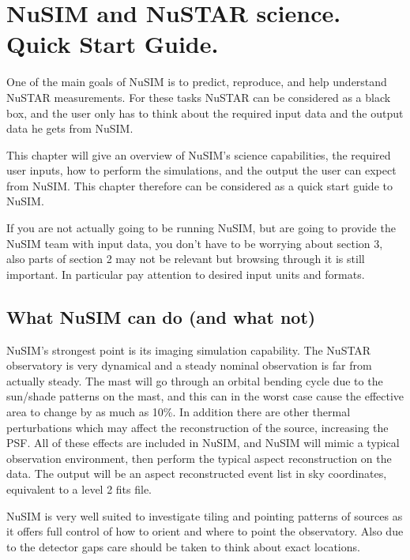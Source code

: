 %

\chapter{NuSIM and NuSTAR science. Quick Start Guide.}
One of the main goals of NuSIM is to predict, reproduce, and help understand NuSTAR measurements.
For these tasks NuSTAR can be considered as a black box, and the user only has to think about the required input data and the output data he gets from NuSIM. 

This chapter will give an overview of NuSIM's science capabilities, the required user inputs, how to perform the simulations, and the output the user can expect from NuSIM. This chapter therefore can be considered as a quick start guide to NuSIM.

If you are not actually going to be running NuSIM, but are going to provide the NuSIM team with input data, you don't have to be worrying about section 3, also parts of section 2 may not be relevant but browsing through it is still important. In particular pay attention to desired input units and formats.

\section{What NuSIM can do (and what not)}

NuSIM's strongest point is its imaging simulation capability. The NuSTAR observatory is very dynamical and a steady nominal observation is far from actually steady. The mast will go through an orbital bending cycle due to the sun/shade patterns on the mast, and this can in the worst case cause the effective area to change  by as much as 10\%. In addition there are other thermal perturbations which may affect the reconstruction of the source, increasing the PSF. All of these effects are included in NuSIM, and NuSIM will mimic a typical observation environment, then perform the typical aspect reconstruction on the data. The output will be an aspect reconstructed event list in sky coordinates, equivalent to a level 2 fits file.

NuSIM is very well suited to investigate tiling and pointing patterns of sources as it offers full control of how to orient and where to point the observatory. Also due to the detector gaps care should be taken to think about exact locations.

